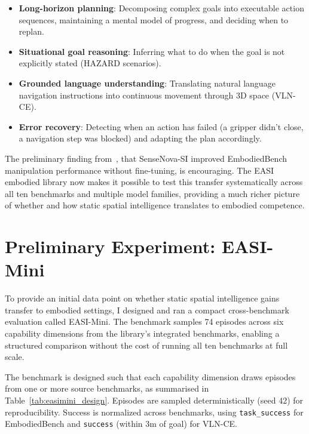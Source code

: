 \begin{itemize}
    \item \textbf{Long-horizon planning}: Decomposing complex goals into executable action sequences, maintaining a mental model of progress, and deciding when to replan.
    \item \textbf{Situational goal reasoning}: Inferring what to do when the goal is not explicitly stated (HAZARD scenarios).
    \item \textbf{Grounded language understanding}: Translating natural language navigation instructions into continuous movement through 3D space (VLN-CE).
    \item \textbf{Error recovery}: Detecting when an action has failed (a gripper didn't close, a navigation step was blocked) and adapting the plan accordingly.
\end{itemize}

The preliminary finding from~\cite{cai2025scalingspatialintelligencemultimodal}, that SenseNova-SI improved EmbodiedBench manipulation performance without fine-tuning, is encouraging. The EASI embodied library now makes it possible to test this transfer systematically across all ten benchmarks and multiple model families, providing a much richer picture of whether and how static spatial intelligence translates to embodied competence.

\section{Preliminary Experiment: EASI-Mini}

To provide an initial data point on whether static spatial intelligence gains transfer to embodied settings, I designed and ran a compact cross-benchmark evaluation called EASI-Mini. The benchmark samples 74 episodes across six capability dimensions from the library's integrated benchmarks, enabling a structured comparison without the cost of running all ten benchmarks at full scale.

The benchmark is designed such that each capability dimension draws episodes from one or more source benchmarks, as summarised in Table~\ref{tab:easimini_design}. Episodes are sampled deterministically (seed 42) for reproducibility. Success is normalized across benchmarks, using \texttt{task\_success} for EmbodiedBench and \texttt{success} (within 3m of goal) for VLN-CE.

